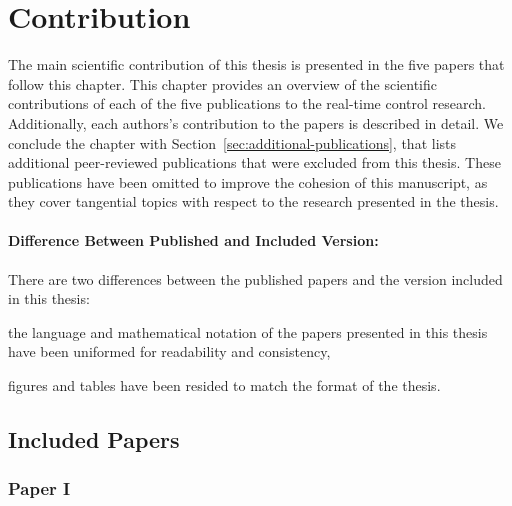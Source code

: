 \chapter{Contribution}%
\label{ch:contribution}%
%

The main scientific contribution of this thesis is presented in the five papers that follow this chapter.
This chapter provides an overview of the scientific contributions of each of the five publications to the real-time control research.
Additionally, each authors's contribution to the papers is described in detail.
We conclude the chapter with Section~\ref{sec:additional-publications}, that lists additional peer-reviewed publications that were excluded from this thesis.
These publications have been omitted to improve the cohesion of this manuscript, as they cover tangential topics with respect to the research presented in the thesis.

\subsubsection*{Difference Between Published and Included Version:}%
There are two differences between the published papers and the version included in this thesis:
%
\begin{enumerate*}[label=(\roman*)]
    \item the language and mathematical notation of the papers presented in this thesis have been uniformed for readability and consistency,
    \item figures and tables have been resided to match the format of the thesis.
\end{enumerate*}


\section{Included Papers}%
\label{sec:paper-summaries}%
%
\subsection*{Paper I}%
%
\begin{quote}
\end{quote}

